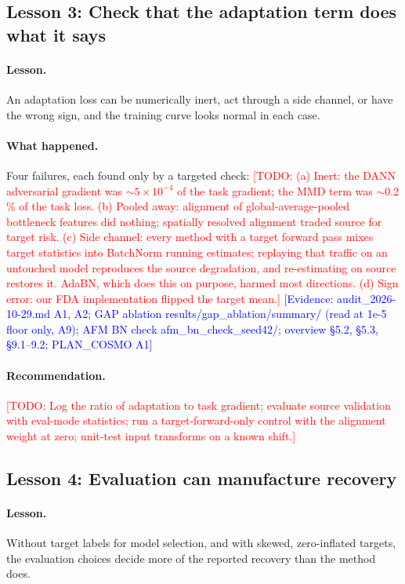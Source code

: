 \documentclass{article}
\newcommand{\todo}[1]{\textcolor{red}{[TODO: #1]}}
\newcommand{\ev}[1]{\textcolor{blue}{[Evidence: #1]}}
\begin{document}
\subsection{Lesson 3: Check that the adaptation term does what it says}
\label{sec:L3}

\paragraph{Lesson.} An adaptation loss can be numerically inert, act
through a side channel, or have the wrong sign, and the training curve
looks normal in each case.

\paragraph{What happened.} Four failures, each found only by a targeted
check:
\todo{(a) Inert: the DANN adversarial gradient was $\sim 5\times10^{-4}$ of
the task gradient; the MMD term was $\sim$0.2\,\% of the task loss.
(b) Pooled away: alignment of global-average-pooled bottleneck features
did nothing; spatially resolved alignment traded source for target risk.
(c) Side channel: every method with a target forward pass mixes target
statistics into BatchNorm running estimates; replaying that traffic on an
untouched model reproduces the source degradation, and re-estimating on
source restores it. AdaBN, which does this on purpose, harmed most
directions. (d) Sign error: our FDA implementation flipped the target
mean.}
\ev{audit\_2026-10-29.md A1, A2; GAP ablation results/gap\_ablation/summary/
(read at 1e-5 floor only, A9); AFM BN check afm\_bn\_check\_seed42/;
overview \S5.2, \S5.3, \S9.1--9.2; PLAN\_COSMO A1}

\paragraph{Recommendation.} \todo{Log the ratio of adaptation to task
gradient; evaluate source validation with eval-mode statistics; run a
target-forward-only control with the alignment weight at zero; unit-test
input transforms on a known shift.}

\subsection{Lesson 4: Evaluation can manufacture recovery}
\label{sec:L4}

\paragraph{Lesson.} Without target labels for model selection, and with
skewed, zero-inflated targets, the evaluation choices decide more of the
reported recovery than the method does.
\end{document}
